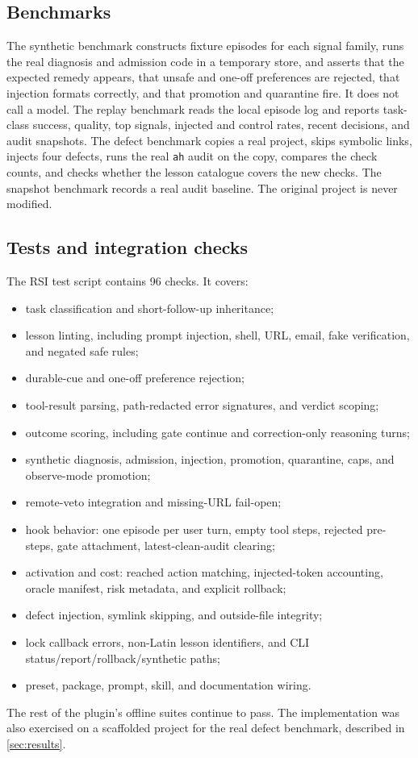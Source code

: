 \subsection{Benchmarks}
\label{sec:benchmarks-impl}
The synthetic benchmark constructs fixture episodes for each signal family, runs the real diagnosis and admission code in a temporary store, and asserts that the expected remedy appears, that unsafe and one-off preferences are rejected, that injection formats correctly, and that promotion and quarantine fire. It does not call a model. The replay benchmark reads the local episode log and reports task-class success, quality, top signals, injected and control rates, recent decisions, and audit snapshots. The defect benchmark copies a real project, skips symbolic links, injects four defects, runs the real \texttt{ah} audit on the copy, compares the check counts, and checks whether the lesson catalogue covers the new checks. The snapshot benchmark records a real audit baseline. The original project is never modified.

\subsection{Tests and integration checks}
\label{sec:tests}
The RSI test script contains 96 checks. It covers:
\begin{itemize}[leftmargin=1.4em,itemsep=1pt]
  \item task classification and short-follow-up inheritance;
  \item lesson linting, including prompt injection, shell, URL, email, fake verification, and negated safe rules;
  \item durable-cue and one-off preference rejection;
  \item tool-result parsing, path-redacted error signatures, and verdict scoping;
  \item outcome scoring, including gate continue and correction-only reasoning turns;
  \item synthetic diagnosis, admission, injection, promotion, quarantine, caps, and observe-mode promotion;
  \item remote-veto integration and missing-URL fail-open;
  \item hook behavior: one episode per user turn, empty tool steps, rejected pre-steps, gate attachment, latest-clean-audit clearing;
  \item activation and cost: reached action matching, injected-token accounting, oracle manifest, risk metadata, and explicit rollback;
  \item defect injection, symlink skipping, and outside-file integrity;
  \item lock callback errors, non-Latin lesson identifiers, and CLI status/report/rollback/synthetic paths;
  \item preset, package, prompt, skill, and documentation wiring.
\end{itemize}
The rest of the plugin's offline suites continue to pass. The implementation was also exercised on a scaffolded \ah{} project for the real defect benchmark, described in \cref{sec:results}.
